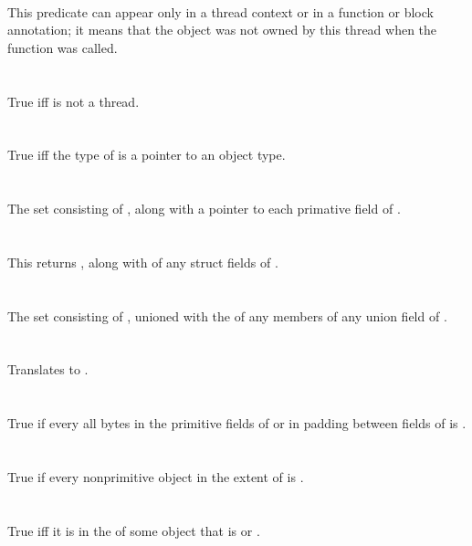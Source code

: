 \documentclass[preprint,nocopyrightspace]{sigplanconf}
\begin{document}
{{{\\
This predicate can appear only in a thread context or in a function or block
 annotation; it means that the object was not owned by this thread
when the function was called.
\\\\
\\
True iff  is not a thread.
\\\\
\\
True iff the type of  is a pointer to an object type. 
\\\\
\\
The set consisting of , along with a pointer to each primative field of .
\\\\
\\
This returns , along with \vcc{\extent} of any struct fields of .
\\\\
\\
The set consisting of , unioned with the  of any members of any union field of .
\\\\
\\
Translates to .
\\\\
\\
True if every all bytes in the primitive fields of  or in padding between fields of  is .
\\\\
\\
True if every nonprimitive object in the extent of  is \vcc{\fresh}.
\\\\
\\
True iff it is in the \vcc{\domain} of some object 
 that is \vcc{\wrapped} or \vcc{\mutable}.
\\\\
\\
}}}
\end{document}
